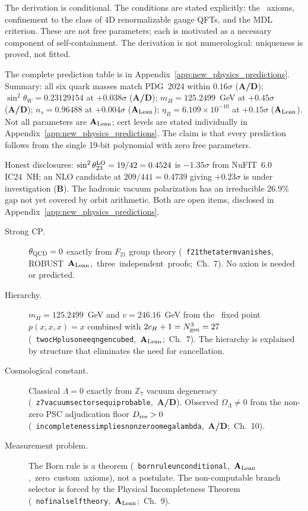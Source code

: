 \documentclass[11pt,openany]{book}
\theoremstyle{remark}
\newcommand{\PSC}{\text{PSC}}
\newcommand{\ZS}{\mathbb{Z}_7}
\newcommand{\lean}[1]{%
  \penalty-100
  \begingroup\def\_{\textunderscore\allowbreak}\texttt{#1}\endgroup}
\newcommand{\OmL}{\Omega_\Lambda}
\newcommand{\Dres}{D_{\rm res}}
\newcommand{\Ngen}{N_{\rm gen}}
\newcommand{\sigW}{\sin^2\!\theta_W}
\newcommand{\SRRG}{\text{SRRG}}
\newcommand{\CatAL}{\ensuremath{\textbf{A}_{\rm Lean}}}
\newcommand{\CatAD}{\textbf{A/D}}
\newcommand{\CatB}{\textbf{B}}
\begin{document}
The derivation is conditional.  The conditions are stated explicitly: the \PSC\ axioms,
confinement to the class of 4D renormalizable gauge QFTs, and the MDL criterion.  These
are not free parameters; each is motivated as a necessary component of self-containment.
The derivation is not numerological: uniqueness is proved, not fitted.

\begin{tcolorbox}[colback=orange!5,colframe=orange!60,
  title={Claim~B: SM Parameter Values at Stated Certification Levels}]
The complete prediction table is in Appendix~\ref{app:new_physics_predictions}.  Summary: all six quark masses match
PDG~2024 within $0.16\sigma$ (\CatAD); $\sigW = 0.23129154$ at $+0.038\sigma$ (\CatAD);
$m_H = 125.2499$~GeV at $+0.45\sigma$ (\CatAD); $n_s = 0.96488$ at $+0.004\sigma$ (\CatAL); $\eta_B = 6.109\times10^{-10}$ at $+0.15\sigma$ (\CatAL).  Not all parameters
are \CatAL; cert levels are stated individually in Appendix~\ref{app:new_physics_predictions}.  The claim is that every
prediction follows from the single 19-bit polynomial with zero free parameters.
\end{tcolorbox}

Honest disclosures: $\sin^2\theta_{23}^{\rm LO} = 19/42 = 0.4524$ is $-1.35\sigma$ from
NuFIT~6.0 IC24~NH; an NLO candidate at $209/441 = 0.4739$ giving $+0.23\sigma$ is under
investigation (\CatB).  The hadronic vacuum polarization has an irreducible 26.9\% gap
not yet covered by orbit arithmetic.  Both are open items, disclosed in Appendix~\ref{app:new_physics_predictions}.

\begin{tcolorbox}[colback=orange!5,colframe=orange!60,
  title={Claim~C: Resolution of Four Long-Standing Open Problems}]
\begin{description}
\item[Strong CP.]  $\theta_{\rm QCD} = 0$ exactly from $F_{21}$ group theory \mbox{(\lean{f21\_theta\_term\_vanishes},} \mbox{ROBUST \CatAL, three independent proofs; Ch.~7)}.
  No axion is needed or predicted.
\item[Hierarchy.]  $m_H = 125.2499$~GeV and $v = 246.16$~GeV from the \SRRG\ fixed
  point $p(x,x,x)=x$ combined with $2c_H+1 = \Ngen^3 = 27$ \mbox{(\lean{two\_cH\_plus\_one\_eq\_ngen\_cubed}, \CatAL; Ch.~7)}.
  The hierarchy is explained by structure that eliminates the need for cancellation.
\item[Cosmological constant.]  Classical $\Lambda = 0$ exactly from $\ZS$ vacuum
  degeneracy \mbox{(\lean{z7\_vacuum\_sectors\_equiprobable}, \CatAD)}.  Observed
  $\OmL \neq 0$ from the non-zero PSC adjudication floor $\Dres > 0$
  \mbox{(\lean{incompleteness\_implies\_nonzero\_omega\_lambda}, \CatAD; Ch.~10)}.
\item[Measurement problem.]  The Born rule is a theorem \mbox{(\lean{born\_rule\_unconditional}, \CatAL, zero custom axioms)}, not a postulate.
  The non-computable branch selector is forced by the Physical Incompleteness Theorem \mbox{(\lean{no\_final\_self\_theory}, \CatAL; Ch.~9)}.
\end{description}
\end{tcolorbox}
\end{document}

